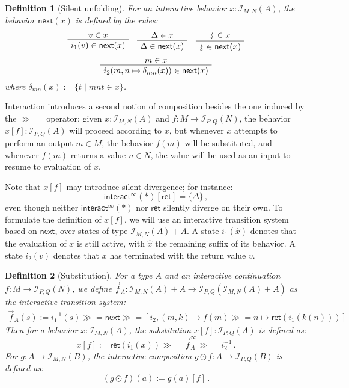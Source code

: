 \documentclass{article}
\newtheorem{definition}{Definition}
\newcommand{\kw}[1]{\ensuremath{ \mathsf{#1} }}
\newcommand{\bind}{\gg\!\!=}
\begin{document}
\begin{definition}[Silent unfolding]
For an interactive behavior $x : \mathcal{I}_{M,N}(A)$,
the behavior $\kw{next}(x)$ is defined by the rules:
\begin{gather*}
    \AxiomC{$v \in x$}
    \UnaryInfC{$i_1(v) \in \kw{next}(x)$}
    \DisplayProof
    \quad
    \AxiomC{$\Delta \in x$}
    \UnaryInfC{$\Delta \in \kw{next}(x)$}
    \DisplayProof
    \quad
    \AxiomC{$\lightning \in x$}
    \UnaryInfC{$\lightning \in \kw{next}(x)$}
    \DisplayProof
    \\[1ex]
    \AxiomC{$m \in x$}
    \UnaryInfC{$i_2(m, n \mapsto \delta_{mn}(x)) \in \kw{next}(x)$}
    \DisplayProof
\end{gather*}
where $\delta_{mn}(x) := \{ t \mid mnt \in x \}$.
\end{definition}

Interaction introduces a second notion of composition
besides the one induced by the $\bind$ operator:
given
$x : \mathcal{I}_{M,N}(A)$ and
$f : M \rightarrow \mathcal{I}_{P,Q}(N)$,
the behavior $x[f] : \mathcal{I}_{P,Q}(A)$
will proceed according to $x$,
but whenever $x$ attempts to perform an output $m \in M$,
the behavior $f(m)$ will be substituted,
and whenever $f(m)$ returns a value $n \in N$,
the value will be used as an input to resume to evaluation of $x$.

Note that $x[f]$ may introduce silent divergence;
for instance:
\[
    \kw{interact}^\infty(*) [\kw{ret}] = \{ \Delta \} \,,
\]
even though neither $\kw{interact}^\infty(*)$
nor $\kw{ret}$ silently diverge on their own.
To formulate the definition of $x[f]$,
we will use an interactive transition system
based on $\kw{next}$,
over states of type $\mathcal{I}_{M,N}(A) + A$.
A state $i_1(\hat{x})$ denotes that
the evaluation of $x$ is still active,
with $\hat{x}$ the remaining suffix of its behavior.
A state $i_2(v)$ denotes that
$x$ has terminated with the return value $v$.

\begin{definition}[Substitution]
For a type $A$ and
an interactive continuation $f : M \rightarrow \mathcal{I}_{P,Q}(N)$,
we define
$\vec{f}_A : \mathcal{I}_{M,N}(A) + A \rightarrow
 \mathcal{I}_{P,Q}(\mathcal{I}_{M,N}(A) + A)$
as the interactive transition system:
\begin{align*}
  \vec{f}_A(s) := i_1^{-1}(s) \bind \kw{next} \bind
      [i_2, (m, k) \mapsto f(m) \bind n \mapsto \kw{ret}(i_1(k(n)))]
\end{align*}
Then for a behavior $x : \mathcal{I}_{M,N}(A)$,
the \emph{substitution} $x[f] : \mathcal{I}_{P,Q}(A)$ is defined as:
\[
    x[f] := \kw{ret}(i_1(x)) \bind \vec{f}_A^\infty \bind i_2^{-1} \,.
\]
For $g : A \rightarrow \mathcal{I}_{M,N}(B)$,
the \emph{interactive composition}
$g \odot f : A \rightarrow \mathcal{I}_{P,Q}(B)$ is defined as:
\[
    (g \odot f)(a) := g(a) [f] \,.
\]
\end{definition}
\end{document}
